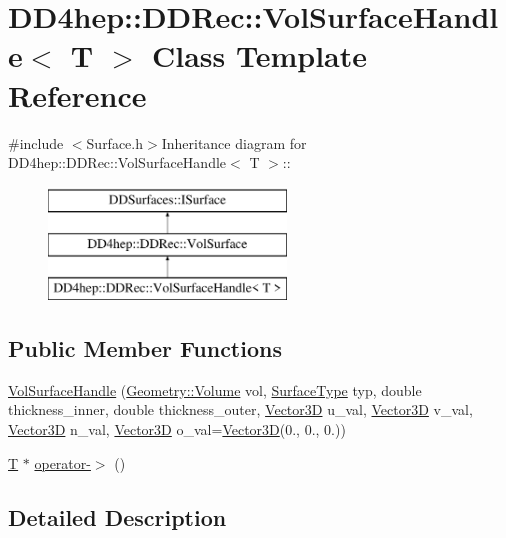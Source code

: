 \hypertarget{class_d_d4hep_1_1_d_d_rec_1_1_vol_surface_handle}{
\section{DD4hep::DDRec::VolSurfaceHandle$<$ T $>$ Class Template Reference}
\label{class_d_d4hep_1_1_d_d_rec_1_1_vol_surface_handle}
}


{\ttfamily \#include $<$Surface.h$>$}Inheritance diagram for DD4hep::DDRec::VolSurfaceHandle$<$ T $>$::\begin{figure}[H]
\begin{center}
\leavevmode
\includegraphics[height=3cm]{class_d_d4hep_1_1_d_d_rec_1_1_vol_surface_handle}
\end{center}
\end{figure}
\subsection*{Public Member Functions}
\begin{DoxyCompactItemize}
\item 
\hyperlink{class_d_d4hep_1_1_d_d_rec_1_1_vol_surface_handle_a94c84574cd5621be9f053d0734f80e46}{VolSurfaceHandle} (\hyperlink{class_d_d4hep_1_1_geometry_1_1_volume}{Geometry::Volume} vol, \hyperlink{class_d_d_surfaces_1_1_surface_type}{SurfaceType} typ, double thickness\_\-inner, double thickness\_\-outer, \hyperlink{class_d_d_surfaces_1_1_vector3_d}{Vector3D} u\_\-val, \hyperlink{class_d_d_surfaces_1_1_vector3_d}{Vector3D} v\_\-val, \hyperlink{class_d_d_surfaces_1_1_vector3_d}{Vector3D} n\_\-val, \hyperlink{class_d_d_surfaces_1_1_vector3_d}{Vector3D} o\_\-val=\hyperlink{class_d_d_surfaces_1_1_vector3_d}{Vector3D}(0., 0., 0.))
\item 
\hyperlink{class_t}{T} $\ast$ \hyperlink{class_d_d4hep_1_1_d_d_rec_1_1_vol_surface_handle_a4151ddc65e68b405fb406ebb6b6622a1}{operator-\/$>$} ()
\end{DoxyCompactItemize}


\subsection{Detailed Description}
